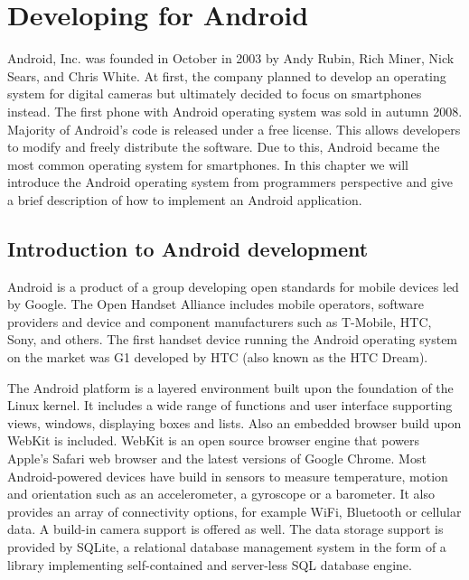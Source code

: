 
\chapter{Developing for Android}
\label{chap:android}

Android, Inc\@. was founded in October in 2003 by Andy Rubin, Rich Miner, Nick Sears, and Chris White. 
At first, the company planned to develop an operating system for digital cameras %
but ultimately %
decided to focus on smartphones instead. %
The first phone with Android operating system was sold in autumn 2008.
Majority of Android's code is released under a free license. 
This allows developers to modify and freely distribute the software.
Due to this, Android became the most common operating system for smartphones.
In this chapter we will introduce the Android operating system from programmers perspective and give a brief description of how to implement an Android application.

\section{Introduction to Android development}

Android is a product of a group developing open standards for mobile devices led by Google.
The Open Handset Alliance includes mobile operators, software providers and device and component manufacturers such as
T-Mobile, HTC, Sony, and others.
The first handset device running the Android operating system on the market was G1 developed by HTC (also known as the HTC Dream). 

The Android platform is a layered environment built upon the foundation of the Linux kernel.
It includes a wide range of functions and user interface supporting views, windows, displaying boxes and lists.
Also an embedded browser build upon WebKit is included.
WebKit is an open source browser engine that powers Apple's Safari web browser and the latest versions of Google Chrome.
Most Android-powered devices have build in sensors to measure temperature, motion and orientation 
such as an accelerometer, a gyroscope or a barometer.
It also provides an array of connectivity options, for example WiFi, Bluetooth or cellular data.
A build-in camera support is offered as well.
The data storage support is provided by SQLite, a relational database management system in the form of a library implementing self-contained and server-less SQL database engine.
 
